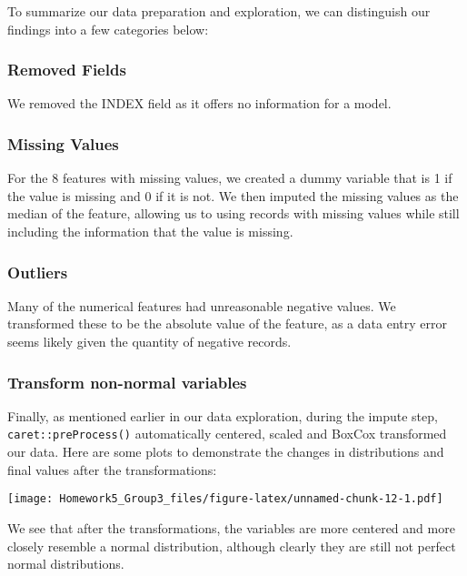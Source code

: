 \documentclass[
]{article}
\begin{document}
To summarize our data preparation and exploration, we can distinguish
our findings into a few categories below:

\hypertarget{removed-fields}{%
\subsubsection{Removed Fields}\label{removed-fields}}

We removed the INDEX field as it offers no information for a model.

\hypertarget{missing-values}{%
\subsubsection{Missing Values}\label{missing-values}}

For the 8 features with missing values, we created a dummy variable that
is 1 if the value is missing and 0 if it is not. We then imputed the
missing values as the median of the feature, allowing us to using
records with missing values while still including the information that
the value is missing.

\hypertarget{outliers}{%
\subsubsection{Outliers}\label{outliers}}

Many of the numerical features had unreasonable negative values. We
transformed these to be the absolute value of the feature, as a data
entry error seems likely given the quantity of negative records.

\hypertarget{transform-non-normal-variables}{%
\subsubsection{Transform non-normal
variables}\label{transform-non-normal-variables}}

Finally, as mentioned earlier in our data exploration, during the impute
step, \texttt{caret::preProcess()} automatically centered, scaled and
BoxCox transformed our data. Here are some plots to demonstrate the
changes in distributions and final values after the transformations:

\texttt{[image: Homework5\_Group3\_files/figure-latex/unnamed-chunk-12-1.pdf]}

We see that after the transformations, the variables are more centered
and more closely resemble a normal distribution, although clearly they
are still not perfect normal distributions.
\end{document}
